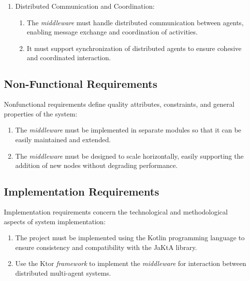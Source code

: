 \begin{enumerate}
\begin{enumerate}
\begin{enumerate}
            \end{enumerate}
      \end{enumerate}
      \item Distributed Communication and Coordination:
      \begin{enumerate}
            \item The \textit{middleware} must handle distributed communication between agents, enabling message exchange and coordination of activities.
            \item It must support synchronization of distributed agents to ensure cohesive and coordinated interaction.
      \end{enumerate}
\end{enumerate}
\subsection{Non-Functional Requirements}
Nonfunctional requirements define quality attributes, constraints, and general properties of the system:

\begin{enumerate}
      \item The \textit{middleware} must be implemented in separate modules so that it can be easily maintained and extended.
      \item The \textit{middleware} must be designed to scale horizontally, easily supporting the addition of new nodes without degrading performance.
\end{enumerate}

\subsection{Implementation Requirements}
Implementation requirements concern the technological and methodological aspects of system implementation:

\begin{enumerate}
      \item The project must be implemented using the Kotlin programming language to ensure consistency and compatibility with the JaKtA library.
      \item Use the Ktor \textit{framework} to implement the \textit{middleware} for interaction between distributed multi-agent systems.
\end{enumerate}


